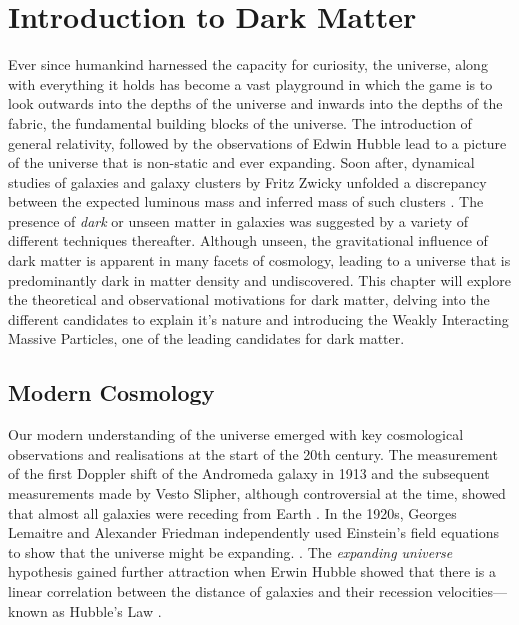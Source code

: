\chapter{Introduction to Dark Matter}
\label{chap:chap1}


Ever since humankind harnessed the capacity for curiosity, the universe, along with everything it holds has become a vast playground in which the game is to look outwards into the depths of the universe and inwards into the depths of the fabric, the fundamental building blocks of the universe. The introduction of general relativity, followed by the observations of Edwin Hubble lead to a picture of the universe that is non-static and ever expanding. Soon after, dynamical studies of galaxies and galaxy clusters by Fritz Zwicky unfolded a discrepancy between the expected luminous mass and inferred mass of such clusters \cite{Fritz_Zwicky_1993}. The presence of \textit{dark} or unseen matter in galaxies was suggested by a variety of different techniques thereafter. Although unseen, the gravitational influence of dark matter is apparent in many facets of cosmology, leading to a universe that is predominantly dark in matter density and undiscovered. This chapter will explore the theoretical and observational motivations for dark matter, delving into the different candidates to explain it's nature and introducing the Weakly Interacting Massive Particles, one of the leading candidates for dark matter. 

\section{Modern Cosmology}
\label{sec:moderncosmology}

Our modern understanding of the universe emerged with key cosmological observations and realisations at the start of the 20th century. The measurement of the first Doppler shift of the Andromeda galaxy in 1913 and the subsequent measurements made by Vesto Slipher, although controversial at the time, showed that almost all galaxies were receding from Earth \cite{Slipler}. In the 1920s, Georges Lemaitre and Alexander Friedman independently used Einstein's field equations to show that the universe might be expanding. \cite{Friedman}. 
The \textit{expanding universe} hypothesis gained further attraction when Erwin Hubble showed that there is a linear correlation between the distance of galaxies and their recession velocities---known as Hubble's Law \cite{Hubble}.


